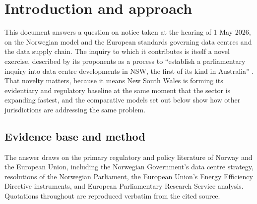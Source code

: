 \chapter{Introduction and approach}
\label{ch:qon:intro}

This document answers a question on notice taken at the hearing of 1 May 2026, on the Norwegian model and the European standards governing data centres and the data supply chain. The inquiry to which it contributes is itself a novel exercise, described by its proponents as a process to \enquote{establish a parliamentary inquiry into data centre developments in NSW, the first of its kind in Australia} \autocite{greensNSWDataCentreInquiry2026}. That novelty matters, because it means New South Wales is forming its evidentiary and regulatory baseline at the same moment that the sector is expanding fastest, and the comparative models set out below show how other jurisdictions are addressing the same problem.

\section{Evidence base and method}
\label{sec:qon:method}

The answer draws on the primary regulatory and policy literature of Norway and the European Union, including the Norwegian Government's data centre strategy, resolutions of the Norwegian Parliament, the European Union's Energy Efficiency Directive instruments, and European Parliamentary Research Service analysis. Quotations throughout are reproduced verbatim from the cited source.

